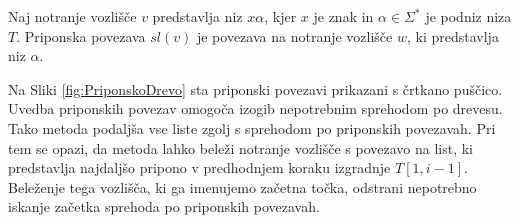 \begin{defi}\label{def:sl}
    Naj notranje vozlišče $v$ predstavlja niz $x\alpha$, kjer $x$ je znak in $\alpha\in\Sigma^*$ je podniz niza $T$. Priponska povezava $\textit{sl}(v)$ je povezava na notranje vozlišče $w$, ki predstavlja niz $\alpha$.

\end{defi}

Na Sliki \ref{fig:PriponskoDrevo} sta priponski povezavi prikazani s črtkano puščico. Uvedba priponskih povezav omogoča izogib nepotrebnim sprehodom po drevesu. Tako metoda podaljša vse liste zgolj s sprehodom po priponskih povezavah. Pri tem se opazi, da metoda lahko beleži notranje vozlišče s povezavo na list, ki predstavlja najdaljšo pripono v predhodnjem koraku izgradnje $T[1,i-1]$. Beleženje tega vozlišča, ki ga imenujemo začetna točka, odstrani nepotrebno iskanje začetka sprehoda po priponskih povezavah.

